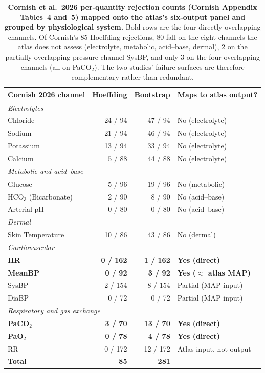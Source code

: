 \documentclass[pdflatex,sn-nature]{sn-jnl}%
\begin{document}
\begin{table}[htbp]
\centering
\caption{\textbf{Cornish et al.\ 2026 per-quantity rejection counts (Cornish Appendix Tables~4 and~5) mapped onto the atlas's six-output panel and grouped by physiological system.} Bold rows are the four directly overlapping channels. Of Cornish's 85 Hoeffding rejections, 80 fall on the eight channels the atlas does not assess (electrolyte, metabolic, acid--base, dermal), 2 on the partially overlapping pressure channel SysBP, and only 3 on the four overlapping channels (all on PaCO$_2$). The two studies' failure surfaces are therefore complementary rather than redundant.}
\label{tab:s7-cornish}
\begin{tabular}{lrrl}
\toprule
Cornish 2026 channel & Hoeffding & Bootstrap & Maps to atlas output? \\
\midrule
\multicolumn{4}{l}{\textit{Electrolytes}} \\
Chloride            & 24 / 94 & 47 / 94 & No (electrolyte) \\
Sodium              & 21 / 94 & 46 / 94 & No (electrolyte) \\
Potassium           & 13 / 94 & 33 / 94 & No (electrolyte) \\
Calcium             & 5 / 88  & 44 / 88 & No (electrolyte) \\
\midrule
\multicolumn{4}{l}{\textit{Metabolic and acid--base}} \\
Glucose             & 5 / 96  & 19 / 96 & No (metabolic) \\
HCO$_3$ (Bicarbonate) & 2 / 90 & 8 / 90  & No (acid--base) \\
Arterial pH         & 0 / 80  & 0 / 80  & No (acid--base) \\
\midrule
\multicolumn{4}{l}{\textit{Dermal}} \\
Skin Temperature    & 10 / 86 & 43 / 86 & No (dermal) \\
\midrule
\multicolumn{4}{l}{\textit{Cardiovascular}} \\
\textbf{HR}         & \textbf{0 / 162} & \textbf{1 / 162}  & \textbf{Yes (direct)} \\
\textbf{MeanBP}     & \textbf{0 / 92}  & \textbf{3 / 92}   & \textbf{Yes ($\approx$ atlas MAP)} \\
SysBP               & 2 / 154 & 8 / 154 & Partial (MAP input) \\
DiaBP               & 0 / 72  & 0 / 72  & Partial (MAP input) \\
\midrule
\multicolumn{4}{l}{\textit{Respiratory and gas exchange}} \\
\textbf{PaCO$_2$}   & \textbf{3 / 70}  & \textbf{13 / 70}  & \textbf{Yes (direct)} \\
\textbf{PaO$_2$}    & \textbf{0 / 78}  & \textbf{4 / 78}   & \textbf{Yes (direct)} \\
RR                  & 0 / 172 & 12 / 172 & Atlas input, not output \\
\midrule
\textbf{Total} & \textbf{85} & \textbf{281} & \\
\bottomrule
\end{tabular}
\end{table}
\end{document}
